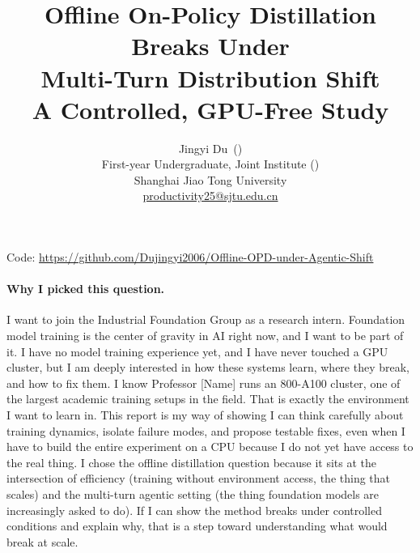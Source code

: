 \documentclass[11pt]{article}
\title{\textbf{Offline On-Policy Distillation Breaks Under\\ Multi-Turn Distribution Shift}\\[0.3em]
\large A Controlled, GPU-Free Study}
\author{Jingyi Du \,(\cn{杜兢漪})\\[0.2em]
\normalsize First-year Undergraduate, Joint Institute (\cn{密院大一本科生})\\
\normalsize Shanghai Jiao Tong University\\
\normalsize \href{mailto:productivity25@sjtu.edu.cn}{productivity25@sjtu.edu.cn}}
\date{}
\begin{document}
\maketitle

\begin{center}
\small Code: \faGithub\;\url{https://github.com/Dujingyi2006/Offline-OPD-under-Agentic-Shift}
\end{center}

\paragraph{Why I picked this question.}
I want to join the Industrial Foundation Group as a research intern. Foundation
model training is the center of gravity in AI right now, and I want to be part
of it. I have no model training experience yet, and I have never touched a GPU
cluster, but I am deeply interested in how these systems learn, where they
break, and how to fix them. I know Professor [Name] runs an 800-A100 cluster,
one of the largest academic training setups in the field. That is exactly the
environment I want to learn in. This report is my way of showing I can think
carefully about training dynamics, isolate failure modes, and propose testable
fixes, even when I have to build the entire experiment on a CPU because I do
not yet have access to the real thing. I chose the offline distillation question
because it sits at the intersection of efficiency (training without environment
access, the thing that scales) and the multi-turn agentic setting (the thing
foundation models are increasingly asked to do). If I can show the method breaks
under controlled conditions and explain why, that is a step toward understanding
what would break at scale.
\end{document}
